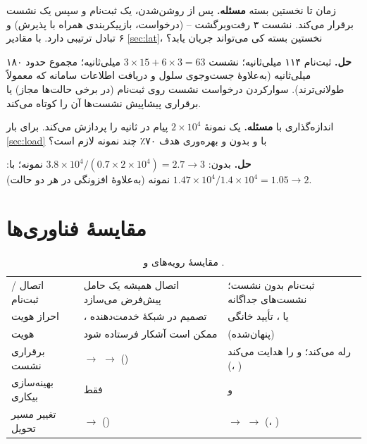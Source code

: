 \documentclass[11pt,a4paper]{article}
\begin{document}
\begin{examplebox}{زمان تا نخستین بسته}\label{ex:first}
\textbf{مسئله.} پس از روشن‌شدن، یک  ثبت‌نام و سپس یک نشست  برقرار می‌کند. نشست  ۳ رفت‌وبرگشت
-- (درخواست، بازپیکربندی  همراه با پذیرش) و ۶ تبادل ترتیبی  دارد. با مقادیر
\cref{sec:lat}، نخستین بسته کی می‌تواند جریان یابد؟

\textbf{حل.} ثبت‌نام ۱۱۴ میلی‌ثانیه؛ نشست  $3\times15 + 6\times3 = 63$ میلی‌ثانیه؛ مجموع حدود ۱۸۰ میلی‌ثانیه (به‌علاوهٔ
جست‌وجوی سلول و دریافت اطلاعات سامانه که معمولاً طولانی‌ترند). سوارکردن درخواست نشست  روی ثبت‌نام (در برخی حالت‌ها
مجاز) یا برقراری پیشاپیش نشست‌ها آن را کوتاه می‌کند.
\end{examplebox}

\begin{examplebox}{اندازه‌گذاری با }\label{ex:inactive}
\textbf{مسئله.} یک نمونهٔ  $2\times10^4$ پیام در ثانیه را پردازش می‌کند. برای بار \cref{sec:load} با و بدون
 و بهره‌وری هدف ۷۰٪ چند نمونه لازم است؟

\textbf{حل.} بدون: $3.8\times10^4/(0.7\times2\times10^4) = 2.7 \to 3$ نمونه؛ با: $1.47\times10^4/1.4\times10^4 = 1.05 \to 2$ نمونه (به‌علاوهٔ
افزونگی در هر دو حالت).
\end{examplebox}

\section{مقایسهٔ فناوری‌ها}
\begin{table}[htbp]
\centering\small
\caption{مقایسهٔ رویه‌های  و .}\label{tab:cmp}
\begin{tabularx}{\linewidth}{@{}l Y Y@{}}
\toprule
{} &  &  \\
\midrule
اتصال / ثبت‌نام       & اتصال همیشه یک حامل پیش‌فرض می‌سازد     & ثبت‌نام بدون نشست؛ نشست‌های  جداگانه \\
احراز هویت           & ، تصمیم در شبکهٔ خدمت‌دهنده   &  یا ، تأیید خانگی \\
هویت                 &  ممکن است آشکار فرستاده شود     &  (پنهان‌شده) \\
برقراری نشست         &  $\to$  $\to$  () &  رله می‌کند؛   و  را هدایت می‌کند (، ) \\
بهینه‌سازی بیکاری    & فقط                          &  و  \\
تغییر مسیر تحویل     &  $\to$  ()      &  $\to$  $\to$  (، ) \\
\bottomrule
\end{tabularx}
\end{table}
\end{document}
